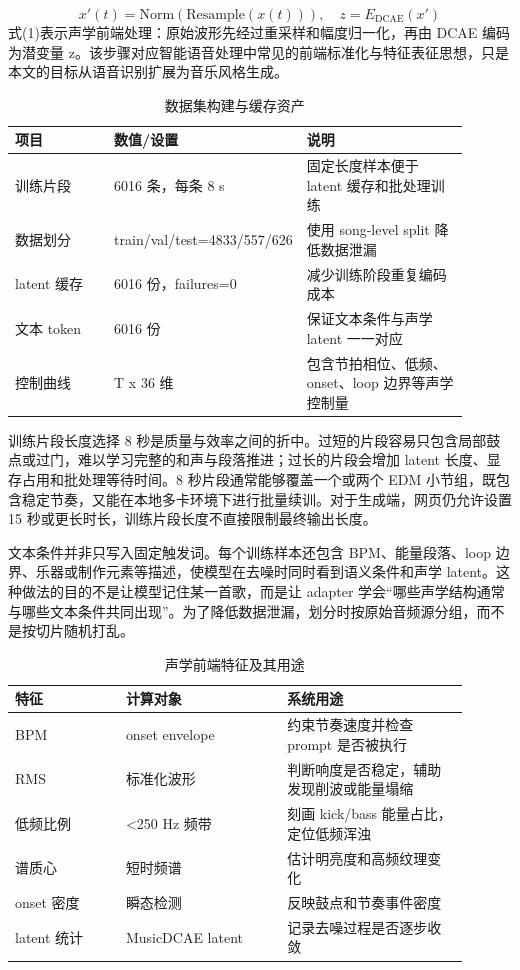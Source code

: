 \documentclass[UTF8,a4paper,zihao=-4,fontset=none]{ctexart}
\begin{document}
\begin{equation}
x'(t)=\mathrm{Norm}(\mathrm{Resample}(x(t))),\quad z=E_{\mathrm{DCAE}}(x')
\end{equation}
式(1)表示声学前端处理：原始波形先经过重采样和幅度归一化，再由 DCAE 编码为潜变量 z。该步骤对应智能语音处理中常见的前端标准化与特征表征思想，只是本文的目标从语音识别扩展为音乐风格生成。

\begin{table}[H]
\centering
\caption{数据集构建与缓存资产}
\small
\begin{tabular}{p{0.22\linewidth}p{0.32\linewidth}p{0.36\linewidth}}
\toprule
项目 & 数值/设置 & 说明 \\
\midrule
训练片段 & 6016 条，每条 8 s & 固定长度样本便于 latent 缓存和批处理训练 \\
数据划分 & train/val/test=4833/557/626 & 使用 song-level split 降低数据泄漏 \\
latent 缓存 & 6016 份，failures=0 & 减少训练阶段重复编码成本 \\
文本 token & 6016 份 & 保证文本条件与声学 latent 一一对应 \\
控制曲线 & T x 36 维 & 包含节拍相位、低频、onset、loop 边界等声学控制量 \\
\bottomrule
\end{tabular}
\end{table}
训练片段长度选择 8 秒是质量与效率之间的折中。过短的片段容易只包含局部鼓点或过门，难以学习完整的和声与段落推进；过长的片段会增加 latent 长度、显存占用和批处理等待时间。8 秒片段通常能够覆盖一个或两个 EDM 小节组，既包含稳定节奏，又能在本地多卡环境下进行批量续训。对于生成端，网页仍允许设置 15 秒或更长时长，训练片段长度不直接限制最终输出长度。

文本条件并非只写入固定触发词。每个训练样本还包含 BPM、能量段落、loop 边界、乐器或制作元素等描述，使模型在去噪时同时看到语义条件和声学 latent。这种做法的目的不是让模型记住某一首歌，而是让 adapter 学会“哪些声学结构通常与哪些文本条件共同出现”。为了降低数据泄漏，划分时按原始音频源分组，而不是按切片随机打乱。

\begin{table}[H]
\centering
\caption{声学前端特征及其用途}
\small
\begin{tabular}{p{0.22\linewidth}p{0.32\linewidth}p{0.36\linewidth}}
\toprule
特征 & 计算对象 & 系统用途 \\
\midrule
BPM & onset envelope & 约束节奏速度并检查 prompt 是否被执行 \\
RMS & 标准化波形 & 判断响度是否稳定，辅助发现削波或能量塌缩 \\
低频比例 & <250 Hz 频带 & 刻画 kick/bass 能量占比，定位低频浑浊 \\
谱质心 & 短时频谱 & 估计明亮度和高频纹理变化 \\
onset 密度 & 瞬态检测 & 反映鼓点和节奏事件密度 \\
latent 统计 & MusicDCAE latent & 记录去噪过程是否逐步收敛 \\
\bottomrule
\end{tabular}
\end{table}
\end{document}
